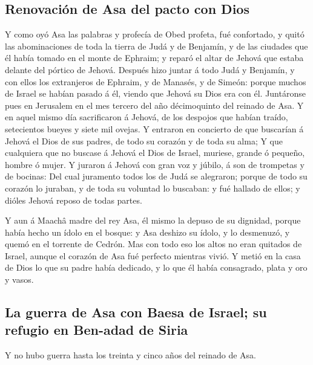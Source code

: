 \hypertarget{renovaciuxf3n-de-asa-del-pacto-con-dios}{%
\subsection{Renovación de Asa del pacto con
Dios}\label{renovaciuxf3n-de-asa-del-pacto-con-dios}}

 Y como oyó Asa las palabras y profecía de Obed profeta, fué
confortado, y quitó las abominaciones de toda la tierra de Judá y de
Benjamín, y de las ciudades que él había tomado en el monte de Ephraim;
y reparó el altar de Jehová que estaba delante del pórtico de Jehová.
 Después hizo juntar á todo Judá y Benjamín, y con ellos los
extranjeros de Ephraim, y de Manasés, y de Simeón: porque muchos de
Israel se habían pasado á él, viendo que Jehová su Dios era con él.
 Juntáronse pues en Jerusalem en el mes tercero del año
décimoquinto del reinado de Asa.  Y en aquel mismo día
sacrificaron á Jehová, de los despojos que habían traído, setecientos
bueyes y siete mil ovejas.  Y entraron en concierto de que
buscarían á Jehová el Dios de sus padres, de todo su corazón y de toda
su alma;  Y que cualquiera que no buscase á Jehová el Dios
de Israel, muriese, grande ó pequeño, hombre ó mujer.  Y
juraron á Jehová con gran voz y júbilo, á son de trompetas y de bocinas:
 Del cual juramento todos los de Judá se alegraron; porque
de todo su corazón lo juraban, y de toda su voluntad lo buscaban: y fué
hallado de ellos; y dióles Jehová reposo de todas partes.

 Y aun á Maachâ madre del rey Asa, él mismo la depuso de su
dignidad, porque había hecho un ídolo en el bosque: y Asa deshizo su
ídolo, y lo desmenuzó, y quemó en el torrente de Cedrón. 
Mas con todo eso los altos no eran quitados de Israel, aunque el corazón
de Asa fué perfecto mientras vivió.  Y metió en la casa de
Dios lo que su padre había dedicado, y lo que él había consagrado, plata
y oro y vasos.

\hypertarget{la-guerra-de-asa-con-baesa-de-israel-su-refugio-en-ben-adad-de-siria}{%
\subsection{La guerra de Asa con Baesa de Israel; su refugio en Ben-adad
de
Siria}\label{la-guerra-de-asa-con-baesa-de-israel-su-refugio-en-ben-adad-de-siria}}

 Y no hubo guerra hasta los treinta y cinco años del
reinado de Asa.

